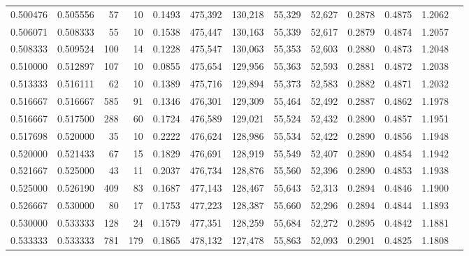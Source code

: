 \begin{tabular}{rrrrrrrrrrrrr}
0.500476 & 0.505556 &     57 &     10 &                                     0.1493 & 475,392 & 130,218 &  55,329 &  52,627 & 0.2878 & 0.4875 & 1.2062 \\
0.506071 & 0.508333 &     55 &     10 &                                     0.1538 & 475,447 & 130,163 &  55,339 &  52,617 & 0.2879 & 0.4874 & 1.2057 \\
0.508333 & 0.509524 &    100 &     14 &                                     0.1228 & 475,547 & 130,063 &  55,353 &  52,603 & 0.2880 & 0.4873 & 1.2048 \\
0.510000 & 0.512897 &    107 &     10 &                                     0.0855 & 475,654 & 129,956 &  55,363 &  52,593 & 0.2881 & 0.4872 & 1.2038 \\
0.513333 & 0.516111 &     62 &     10 &                                     0.1389 & 475,716 & 129,894 &  55,373 &  52,583 & 0.2882 & 0.4871 & 1.2032 \\
0.516667 & 0.516667 &    585 &     91 &                                     0.1346 & 476,301 & 129,309 &  55,464 &  52,492 & 0.2887 & 0.4862 & 1.1978 \\
0.516667 & 0.517500 &    288 &     60 &                                     0.1724 & 476,589 & 129,021 &  55,524 &  52,432 & 0.2890 & 0.4857 & 1.1951 \\
0.517698 & 0.520000 &     35 &     10 &                                     0.2222 & 476,624 & 128,986 &  55,534 &  52,422 & 0.2890 & 0.4856 & 1.1948 \\
0.520000 & 0.521433 &     67 &     15 &                                     0.1829 & 476,691 & 128,919 &  55,549 &  52,407 & 0.2890 & 0.4854 & 1.1942 \\
0.521667 & 0.525000 &     43 &     11 &                                     0.2037 & 476,734 & 128,876 &  55,560 &  52,396 & 0.2890 & 0.4853 & 1.1938 \\
0.525000 & 0.526190 &    409 &     83 &                                     0.1687 & 477,143 & 128,467 &  55,643 &  52,313 & 0.2894 & 0.4846 & 1.1900 \\
0.526667 & 0.530000 &     80 &     17 &                                     0.1753 & 477,223 & 128,387 &  55,660 &  52,296 & 0.2894 & 0.4844 & 1.1893 \\
0.530000 & 0.533333 &    128 &     24 &                                     0.1579 & 477,351 & 128,259 &  55,684 &  52,272 & 0.2895 & 0.4842 & 1.1881 \\
0.533333 & 0.533333 &    781 &    179 &                                     0.1865 & 478,132 & 127,478 &  55,863 &  52,093 & 0.2901 & 0.4825 & 1.1808 \\

\end{tabular}
